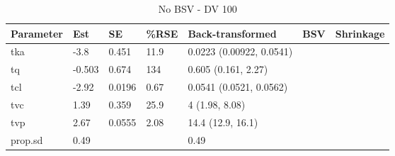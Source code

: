 \begin{table}
\centering\centering
\caption{No BSV - DV 100}
\centering
\fontsize{8}{10}\selectfont
\begin{tabular}[t]{lllllll}
\toprule
\textbf{Parameter} & \textbf{Est} & \textbf{SE} & \textbf{\%RSE} & \textbf{Back-transformed} & \textbf{BSV} & \textbf{Shrinkage}\\
\midrule
tka & -3.8 & 0.451 & 11.9 & 0.0223 (0.00922, 0.0541) &  & \\
\midrule
tq & -0.503 & 0.674 & 134 & 0.605 (0.161, 2.27) &  & \\
\midrule
tcl & -2.92 & 0.0196 & 0.67 & 0.0541 (0.0521, 0.0562) &  & \\
\midrule
tvc & 1.39 & 0.359 & 25.9 & 4 (1.98, 8.08) &  & \\
\midrule
tvp & 2.67 & 0.0555 & 2.08 & 14.4 (12.9, 16.1) &  & \\
\midrule
prop.sd & 0.49 &  &  & 0.49 &  & \\
\bottomrule
\end{tabular}
\end{table}